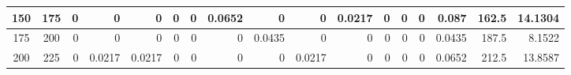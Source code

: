 \begin{table}[ht]
\begin{adjustbox}{width = \textwidth, center}
\begin{tabular}{|cc|r|r|r|r|r|r|r|r|r|r|r|r|r|r|r|}
            \rowcolor[HTML]{FFFFFF} 
            \cellcolor[HTML]{D9EAD3}150            & \cellcolor[HTML]{C8E4BE}175            & 0                                              & 0                                              & 0                                              & 0                                              & 0                                              & \cellcolor[HTML]{57BB8A}0.0652                 & 0                                              & 0                                               & \cellcolor[HTML]{C7E9D8}0.0217                  & 0                                               & 0                                               & 0                                               & \cellcolor[HTML]{D9D2E9}0.087                                                   & \cellcolor[HTML]{D9D2E9}162.5                                           & \cellcolor[HTML]{D9D2E9}14.1304                                                       \\ \hline
            \rowcolor[HTML]{FFFFFF} 
            \cellcolor[HTML]{D9EAD3}175            & \cellcolor[HTML]{C8E4BE}200            & 0                                              & 0                                              & 0                                              & 0                                              & 0                                              & 0                                              & \cellcolor[HTML]{8FD2B1}0.0435                 & 0                                               & 0                                               & 0                                               & 0                                               & 0                                               & \cellcolor[HTML]{D9D2E9}0.0435                                                  & \cellcolor[HTML]{D9D2E9}187.5                                           & \cellcolor[HTML]{D9D2E9}8.1522                                                        \\ \hline
            \rowcolor[HTML]{FFFFFF} 
            \cellcolor[HTML]{D9EAD3}200            & \cellcolor[HTML]{C8E4BE}225            & 0                                              & \cellcolor[HTML]{C7E9D8}0.0217                 & \cellcolor[HTML]{C7E9D8}0.0217                 & 0                                              & 0                                              & 0                                              & 0                                              & \cellcolor[HTML]{C7E9D8}0.0217                  & 0                                               & 0                                               & 0                                               & 0                                               & \cellcolor[HTML]{D9D2E9}0.0652                                                  & \cellcolor[HTML]{D9D2E9}212.5                                           & \cellcolor[HTML]{D9D2E9}13.8587                                                       \\ \hline

\end{tabular}
\end{adjustbox}
\end{table}
